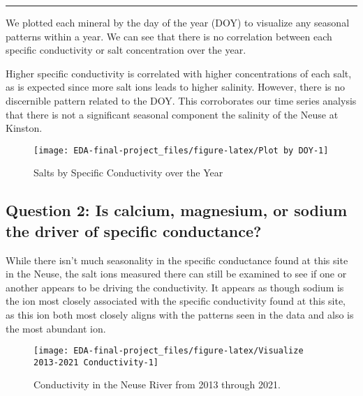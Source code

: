 \documentclass[
  12pt,
]{article}
\begin{document}
\begin{center}\rule{0.5\linewidth}{0.5pt}\end{center}

\newpage

We plotted each mineral by the day of the year (DOY) to visualize any
seasonal patterns within a year. We can see that there is no correlation
between each specific conductivity or salt concentration over the year.

Higher specific conductivity is correlated with higher concentrations of
each salt, as is expected since more salt ions leads to higher salinity.
However, there is no discernible pattern related to the DOY. This
corroborates our time series analysis that there is not a significant
seasonal component the salinity of the Neuse at Kinston.

\begin{figure}

\texttt{[image: EDA-final-project\_files/figure-latex/Plot by DOY-1]} \hfill{}

\caption{Salts by Specific Conductivity over the Year}\label{fig:Plot by DOY}
\end{figure}

\newpage

\hypertarget{question-2-is-calcium-magnesium-or-sodium-the-driver-of-specific-conductance}{%
\subsection{Question 2: Is calcium, magnesium, or sodium the driver of
specific
conductance?}\label{question-2-is-calcium-magnesium-or-sodium-the-driver-of-specific-conductance}}

While there isn't much seasonality in the specific conductance found at
this site in the Neuse, the salt ions measured there can still be
examined to see if one or another appears to be driving the
conductivity. It appears as though sodium is the ion most closely
associated with the specific conductivity found at this site, as this
ion both most closely aligns with the patterns seen in the data and also
is the most abundant ion.

\begin{figure}

\texttt{[image: EDA-final-project\_files/figure-latex/Visualize 2013-2021 Conductivity-1]} \hfill{}

\caption{Conductivity in the Neuse River from 2013 through 2021.}\label{fig:Visualize 2013-2021 Conductivity}
\end{figure}
\end{document}
